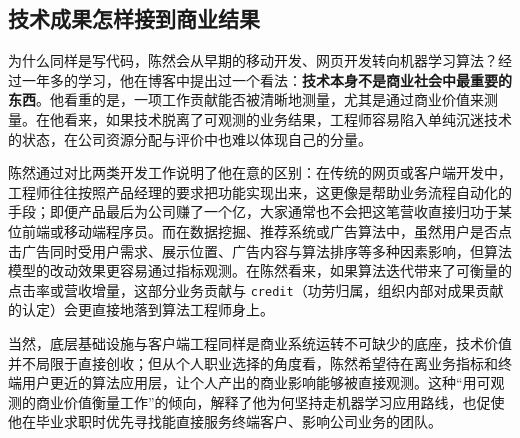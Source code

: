 \documentclass[UTF8,a4paper,11pt,fontset=fandol]{ctexart}
\begin{document}
\subsection{技术成果怎样接到商业结果}
为什么同样是写代码，陈然会从早期的移动开发、网页开发转向机器学习算法？经过一年多的学习，他在博客中提出过一个看法：\textbf{技术本身不是商业社会中最重要的东西}。他看重的是，一项工作贡献能否被清晰地测量，尤其是通过商业价值来测量。在他看来，如果技术脱离了可观测的业务结果，工程师容易陷入单纯沉迷技术的状态，在公司资源分配与评价中也难以体现自己的分量。

陈然通过对比两类开发工作说明了他在意的区别：在传统的网页或客户端开发中，工程师往往按照产品经理的要求把功能实现出来，这更像是帮助业务流程自动化的手段；即便产品最后为公司赚了一个亿，大家通常也不会把这笔营收直接归功于某位前端或移动端程序员。而在数据挖掘、推荐系统或广告算法中，虽然用户是否点击广告同时受用户需求、展示位置、广告内容与算法排序等多种因素影响，但算法模型的改动效果更容易通过指标观测。在陈然看来，如果算法迭代带来了可衡量的点击率或营收增量，这部分业务贡献与 \texttt{credit}（功劳归属，组织内部对成果贡献的认定）会更直接地落到算法工程师身上。

当然，底层基础设施与客户端工程同样是商业系统运转不可缺少的底座，技术价值并不局限于直接创收；但从个人职业选择的角度看，陈然希望待在离业务指标和终端用户更近的算法应用层，让个人产出的商业影响能够被直接观测。这种“用可观测的商业价值衡量工作”的倾向，解释了他为何坚持走机器学习应用路线，也促使他在毕业求职时优先寻找能直接服务终端客户、影响公司业务的团队。
\end{document}
